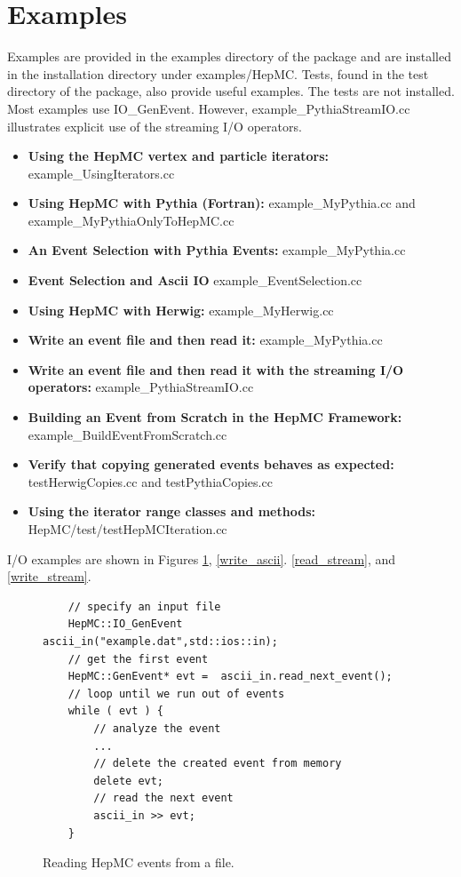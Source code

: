 \documentclass[11pt,letterpaper]{article}
\begin{document}
%
%

\section{Examples}
\label{examples}
Examples are provided in the examples directory of the package 
and are installed in the installation directory under examples/HepMC.
Tests, found in the test directory of the package, also provide useful examples.
The tests are not installed.
Most examples use IO\_GenEvent.
However, example\_PythiaStreamIO.cc illustrates explicit use of the 
streaming I/O operators.

\begin{itemize}\setlength{\itemsep}{0pt}
  \item{\bf Using the HepMC vertex and particle iterators:}
       {example\_UsingIterators.cc} 
  \item{\bf Using HepMC with Pythia (Fortran):}
      {example\_MyPythia.cc and example\_MyPythiaOnlyToHepMC.cc}
  \item{\bf An Event Selection with Pythia Events:}
      {example\_MyPythia.cc}
  \item{\bf Event Selection and Ascii IO}
      {example\_EventSelection.cc}
  \item{\bf Using HepMC with Herwig:}
     {example\_MyHerwig.cc}
 \item{\bf Write an event file and then read it:}
     {example\_MyPythia.cc}
 \item{\bf Write an event file and then read it with the streaming I/O operators:}
     {example\_PythiaStreamIO.cc}
  \item{\bf Building an Event from Scratch in the HepMC Framework:}
     {example\_BuildEventFromScratch.cc}
  \item{\bf Verify that copying generated events behaves as expected:}
     {testHerwigCopies.cc and testPythiaCopies.cc}
  \item{\bf Using the iterator range classes and methods:}
     {HepMC/test/testHepMCIteration.cc}
\end{itemize}

I/O examples are shown in Figures 
\ref{read_ascii}, \ref{write_ascii}.
\ref{read_stream}, and \ref{write_stream}.

\begin{figure}[h]
\caption[IO\_GenEvent example]{\label{read_ascii} 
         Reading HepMC events from a file. }
    {\small \begin{verbatim}
    // specify an input file
    HepMC::IO_GenEvent ascii_in("example.dat",std::ios::in);
    // get the first event
    HepMC::GenEvent* evt =  ascii_in.read_next_event();
    // loop until we run out of events
    while ( evt ) {
        // analyze the event
        ...
        // delete the created event from memory
        delete evt;
        // read the next event
        ascii_in >> evt;
    }
    \end{verbatim}}
\end{figure}
\end{document}
